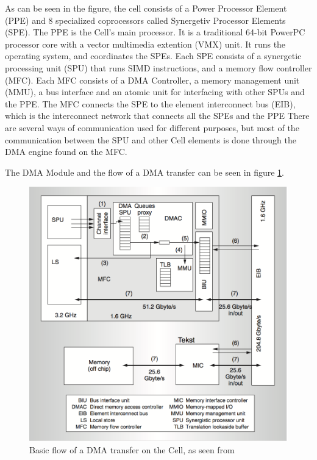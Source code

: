 As can be seen in the figure, the cell consists of a Power Processor Element (PPE) and 8 specialized coprocessors called Synergetiv Processor Elements (SPE).
The PPE is the Cell's main processor.
It is a traditional 64-bit PowerPC processor core with a vector multimedia extention (VMX) unit.
It runs the operating system, and coordinates the SPEs.
Each SPE consists of a synergetic processing unit (SPU) that runs SIMD instructions, and a memory flow controller (MFC).
Each MFC consists of a DMA Controller, a memory management unit (MMU), a bus interface and an atomic unit for interfacing with other SPUs and the PPE.
The MFC connects the SPE to the element interconnect bus (EIB), which is the interconnect network that connects all the SPEs and the PPE
There are several ways of communication used for different purposes, but most of the communication between the SPU and other Cell elements is done through the DMA engine found on the MFC.

The DMA Module and the flow of a DMA transfer can be seen in figure \ref{fig:CellDMA}.
\begin{figure}[h!]
    \centering
    \includegraphics[width=1\textwidth]{Figures/DMA/CellDMA}
    \caption{Basic flow of a DMA transfer on the Cell, as seen from \cite{cell}}
    \label{fig:CellDMA}
\end{figure}

